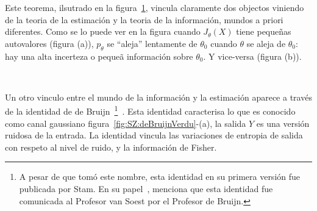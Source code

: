 %
Este teorema, ilsutrado en la figura~\ref{fig:SZ:JCurvatura}, vincula claramente
dos  objectos viniendo  de  la  teoria de  la  estimaci\'on y  la  teoria de  la
informaci\'on, mundos  a priori diferentes.  Como  se lo puede ver  en la figura
cuando $J_\theta(X)$  tiene peque\~nas  autovalores (figura (a)),  $p_\theta$ se
``aleja'' lentamente de  $\theta_0$ cuando $\theta$ se aleja  de $\theta_0$: hay
una  alta incerteza  o  peque\~a informaci\'on  sobre  $\theta_0$. Y  vice-versa
(figura (b)).
%
\begin{figure}[h!]
  \begin{center}     \end{center}   
\label{fig:SZ:JCurvatura}
\end{figure}

\

Un otro vinculo  entre el mundo de la informaci\'on y  la estimaci\'on aparece a
trav\'es  de la  identidad de  de Bruijn~\footnote{A  pesar de  que  tom\'o este
  nombre, esta identidad  en su primera versi\'on fue publicada  por Stam. En su
  papel~\cite{Sta59}, menciona que esta identidad fue comunicada al Profesor van
  Soest por el Profesor  de Bruijn.}~\cite{Sta59, CovTho06, Joh04, Bar84, Bar86,
  PalVer06}. Esta identidad caracterisa lo  que es conocido como canal gaussiano
figura~\ref{fig:SZ:deBruijnVerdu}-(a),  \ie  la  salida  $Y$  es  una  versi\'on
ruidosa  de la  entrada. La  identidad vincula  las variaciones  de  entropia de
salida con respeto al nivel de ruido, y la informaci\'on de Fisher.

